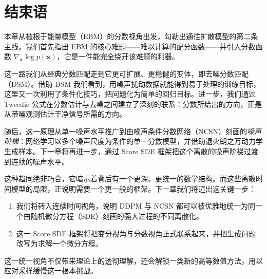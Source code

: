 \section{结束语}\label{sec:ch3_cr}


本章从植根于能量模型（EBM）的分数视角出发，勾勒出通往扩散模型的第二条主线。我们首先指出 EBM 的核心难题——难以计算的配分函数——并引入分数函数 $\nabla_{\mathbf{x}}\log{p(\mathbf{x})}$，它是一件能完全绕开该难题的利器。

这一路我们从经典分数匹配走到它更可扩展、更稳健的变体，即去噪分数匹配（DSM）。借助 DSM 我们看到，用噪声扰动数据就能得到易于处理的训练目标，这里又一次利用了条件化技巧，把问题化为简单的回归目标。进一步，我们通过 Tweedie 公式在分数估计与去噪之间建立了深刻的联系：分数所给出的方向，正是从带噪观测估计干净信号所需的方向。

随后，这一原理从单一噪声水平推广到由噪声条件分数网络（NCSN）刻画的\emph{噪声阶梯}：网络学习以多个噪声尺度为条件的单一分数模型，并借助退火朗之万动力学生成样本。下一章将再进一步，通过 Score SDE 框架把这个离散的噪声阶梯过渡到连续的噪声水平。


这种趋同绝非巧合，它暗示着背后有一个更深、更统一的数学结构。而这些离散时间模型的局限，正说明需要一个更一般的框架。下一章我们将迈出这关键一步：
\begin{enumerate}
    \item 我们将转入连续时间视角，说明 DDPM 与 NCSN 都可以被优雅地统一为同一个由随机微分方程（SDE）刻画的强大过程的不同离散化。
    \item 这一 Score SDE 框架将把变分视角与分数视角正式联系起来，并把生成问题改写为求解一个微分方程。
\end{enumerate}

这一统一视角不仅带来理论上的透彻理解，还会解锁一类新的高等数值方法，用以应对采样缓慢这一根本挑战。
